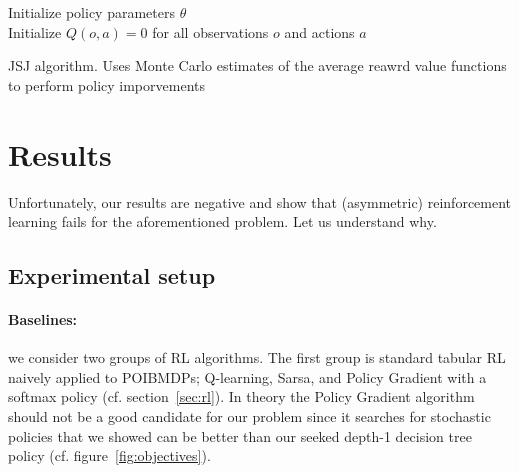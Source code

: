 \begin{algorithm}
    Initialize policy parameters $\theta$ \\
    Initialize $Q(o, a) = 0$ for all observations $o$ and actions $a$ \\
    \caption{JSJ algorithm. Uses Monte Carlo estimates of the average reawrd value functions to perform policy imporvements}\label{alg:jsj}
\end{algorithm}

\section{Results}

Unfortunately, our results are negative and show that (asymmetric) reinforcement learning fails for the aforementioned problem. Let us understand why.

\subsection{Experimental setup}

\paragraph{Baselines:} we consider two groups of RL algorithms.
The first group is standard tabular RL naively applied to POIBMDPs; Q-learning, Sarsa, and Policy Gradient with a softmax policy (cf. section~\ref{sec:rl}).
In theory the Policy Gradient algorithm should not be a good candidate for our problem since it searches for stochastic policies that we showed can be better than our seeked depth-1 decision tree policy (cf. figure~\ref{fig:objectives}).

